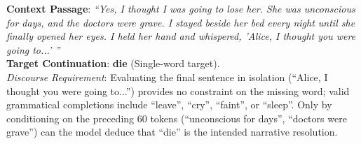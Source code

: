 \documentclass[../../../main.tex]{subfiles}
\begin{document}
\begin{center}
\begin{minipage}{0.95\textwidth}
\begin{tcolorbox}[colback=cardBg,colframe=cardLine,arc=2pt,boxrule=0.5pt,title=\textbf{Task Example: Long-Range Narrative Text Completion (LAMBADA)}]
\small\sffamily
\textbf{Context Passage}: \textit{``Yes, I thought I was going to lose her. She was unconscious for days, and the doctors were grave. I stayed beside her bed every night until she finally opened her eyes. I held her hand and whispered, 'Alice, I thought you were going to...' ''} \\
\textbf{Target Continuation}: \textbf{die} (Single-word target). \\
\textit{Discourse Requirement}: Evaluating the final sentence in isolation (``Alice, I thought you were going to...'') provides no constraint on the missing word; valid grammatical completions include ``leave'', ``cry'', ``faint'', or ``sleep''. Only by conditioning on the preceding 60 tokens (``unconscious for days'', ``doctors were grave'') can the model deduce that ``die'' is the intended narrative resolution.
\end{tcolorbox}
\end{minipage}
\end{center}
\end{document}

